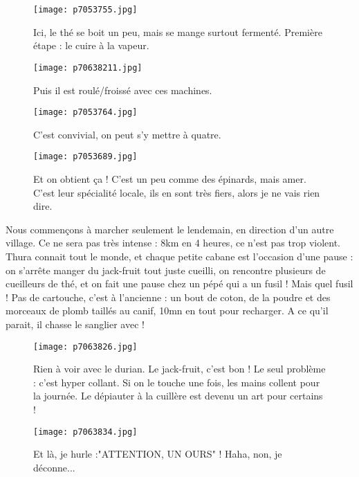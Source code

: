 \documentclass{book}
\begin{document}
\begin{figure}[h]
\centering
\texttt{[image: p7053755.jpg]}
\caption*{Ici, le thé se boit un peu, mais se mange surtout fermenté. Première étape : le cuire à la vapeur.}
\end{figure}


\begin{figure}[h]
\centering
\texttt{[image: p70638211.jpg]}
\caption*{Puis il est roulé/froissé avec ces machines.}
\end{figure}


\begin{figure}[h]
\centering
\texttt{[image: p7053764.jpg]}
\caption*{C'est convivial, on peut s'y mettre à quatre.}
\end{figure}


\begin{figure}[h]
\centering
\texttt{[image: p7053689.jpg]}
\caption*{Et on obtient ça ! C'est un peu comme des épinards, mais amer. C'est leur spécialité locale, ils en sont très fiers, alors je ne vais rien dire.}
\end{figure}

Nous commençons à marcher seulement le lendemain, en direction d'un autre village. Ce ne sera pas très intense : 8km en 4 heures, ce n'est pas trop violent. Thura connait tout le monde, et chaque petite cabane est l'occasion d'une pause : on s'arrête manger du jack-fruit tout juste cueilli, on rencontre plusieurs de cueilleurs de thé, et on fait une pause chez un pépé qui a un fusil ! Mais quel fusil ! Pas de cartouche, c'est à l'ancienne : un bout de coton, de la poudre et des morceaux de plomb taillés au canif, 10mn en tout pour recharger. A ce qu'il parait, il chasse le sanglier avec !


\begin{figure}[h]
\centering
\texttt{[image: p7063826.jpg]}
\caption*{Rien à voir avec le durian. Le jack-fruit, c'est bon ! Le seul problème : c'est hyper collant. Si on le touche une fois, les mains collent pour la journée. Le dépiauter à la cuillère est devenu un art pour certains !}
\end{figure}


\begin{figure}[h]
\centering
\texttt{[image: p7063834.jpg]}
\caption*{Et là, je hurle :"ATTENTION, UN OURS" ! Haha, non, je déconne...}
\end{figure}
\end{document}

